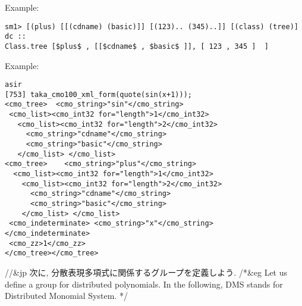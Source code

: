 \noindent
Example:
\begin{verbatim}
sm1> [(plus) [[(cdname) (basic)]] [(123).. (345)..]] [(class) (tree)] dc ::
Class.tree [$plus$ , [[$cdname$ , $basic$ ]], [ 123 , 345 ]  ] 
\end{verbatim}

\noindent
Example:
\begin{verbatim}
asir
[753] taka_cmo100_xml_form(quote(sin(x+1)));
<cmo_tree>  <cmo_string>"sin"</cmo_string> 
 <cmo_list><cmo_int32 for="length">1</cmo_int32>   
   <cmo_list><cmo_int32 for="length">2</cmo_int32>    
     <cmo_string>"cdname"</cmo_string> 
     <cmo_string>"basic"</cmo_string> 
   </cmo_list> </cmo_list> 
<cmo_tree>    <cmo_string>"plus"</cmo_string> 
  <cmo_list><cmo_int32 for="length">1</cmo_int32>     
    <cmo_list><cmo_int32 for="length">2</cmo_int32>      
      <cmo_string>"cdname"</cmo_string> 
      <cmo_string>"basic"</cmo_string> 
    </cmo_list> </cmo_list> 
 <cmo_indeterminate> <cmo_string>"x"</cmo_string>  </cmo_indeterminate>
 <cmo_zz>1</cmo_zz>
</cmo_tree></cmo_tree>
\end{verbatim}


\bigbreak
//&jp 次に, 分散表現多項式に関係するグループを定義しよう.
/*&eg
Let us define a group for distributed polynomials. In the following,
DMS stands for Distributed Monomial System.
*/


